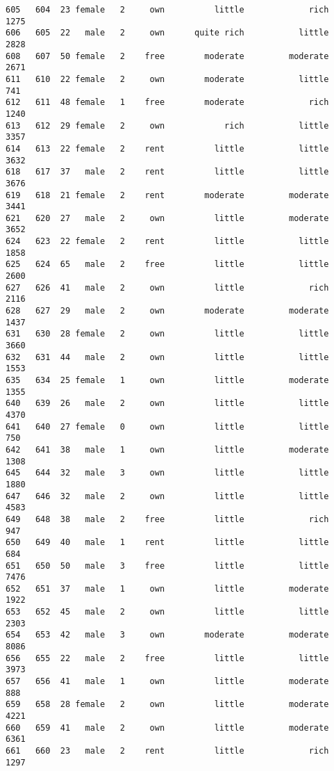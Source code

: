 \documentclass[
]{article}
\begin{document}
\begin{verbatim}
605   604  23 female   2     own          little             rich          1275
606   605  22   male   2     own      quite rich           little          2828
608   607  50 female   2    free        moderate         moderate          2671
611   610  22 female   2     own        moderate           little           741
612   611  48 female   1    free        moderate             rich          1240
613   612  29 female   2     own            rich           little          3357
614   613  22 female   2    rent          little           little          3632
618   617  37   male   2    rent          little           little          3676
619   618  21 female   2    rent        moderate         moderate          3441
621   620  27   male   2     own          little         moderate          3652
624   623  22 female   2    rent          little           little          1858
625   624  65   male   2    free          little           little          2600
627   626  41   male   2     own          little             rich          2116
628   627  29   male   2     own        moderate         moderate          1437
631   630  28 female   2     own          little           little          3660
632   631  44   male   2     own          little           little          1553
635   634  25 female   1     own          little         moderate          1355
640   639  26   male   2     own          little           little          4370
641   640  27 female   0     own          little           little           750
642   641  38   male   1     own          little         moderate          1308
645   644  32   male   3     own          little           little          1880
647   646  32   male   2     own          little           little          4583
649   648  38   male   2    free          little             rich           947
650   649  40   male   1    rent          little           little           684
651   650  50   male   3    free          little           little          7476
652   651  37   male   1     own          little         moderate          1922
653   652  45   male   2     own          little           little          2303
654   653  42   male   3     own        moderate         moderate          8086
656   655  22   male   2    free          little           little          3973
657   656  41   male   1     own          little         moderate           888
659   658  28 female   2     own          little         moderate          4221
660   659  41   male   2     own          little         moderate          6361
661   660  23   male   2    rent          little             rich          1297

\end{verbatim}
\end{document}
